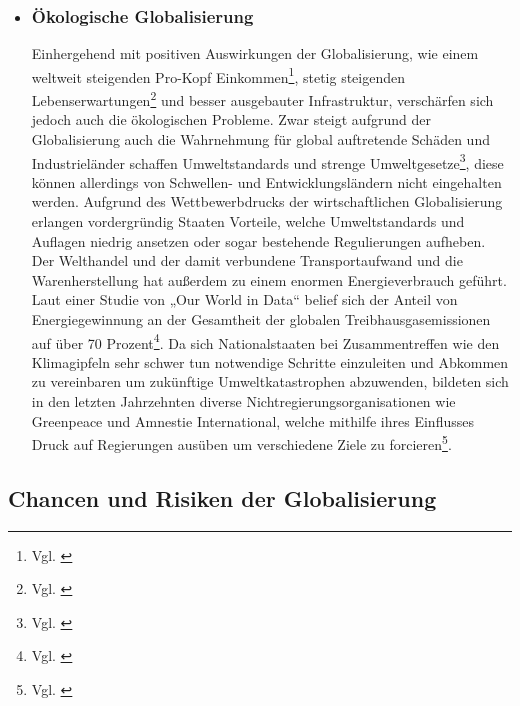 \documentclass[12pt]{article}
\begin{document}
\begin{itemize}
\begin{sloppypar}
    \end{sloppypar}
    \item \subsubsection{Ökologische Globalisierung}
    Einhergehend mit positiven Auswirkungen der Globalisierung, wie einem weltweit steigenden Pro-Kopf Einkommen\footnote{Vgl. \cite{Lammar2013}}, stetig steigenden Lebenserwartungen\footnote{Vgl. \cite{Radtke2021}} und besser ausgebauter Infrastruktur, verschärfen sich jedoch auch die ökologischen Probleme. Zwar steigt aufgrund der Globalisierung auch die Wahrnehmung für global auftretende Schäden und Industrieländer schaffen Umweltstandards und strenge Umweltgesetze\footnote{Vgl. \cite{WikipGlobWirtsch}}, diese können allerdings von Schwellen- und Entwicklungsländern nicht eingehalten werden. Aufgrund des Wettbewerbdrucks der wirtschaftlichen Globalisierung erlangen vordergründig Staaten Vorteile, welche Umweltstandards und Auflagen niedrig ansetzen oder sogar bestehende Regulierungen aufheben. Der Welthandel und der damit verbundene Transportaufwand und die Warenherstellung hat außerdem zu einem enormen Energieverbrauch geführt. Laut einer Studie von „Our World in Data“ belief sich der Anteil von Energiegewinnung an der Gesamtheit der globalen Treibhausgasemissionen auf über 70 Prozent\footnote{Vgl. \cite{Ritchie2021}}. Da sich Nationalstaaten bei Zusammentreffen wie den Klimagipfeln sehr schwer tun notwendige Schritte einzuleiten und Abkommen zu vereinbaren um zukünftige Umweltkatastrophen abzuwenden, bildeten sich in den letzten Jahrzehnten diverse Nichtregierungsorganisationen wie Greenpeace und Amnestie International, welche mithilfe ihres Einflusses Druck auf Regierungen ausüben um verschiedene Ziele zu forcieren\footnote{Vgl. \cite{Ehrlich1966} }.
\end{itemize}
\subsection{Chancen und Risiken der Globalisierung}
\end{document}
